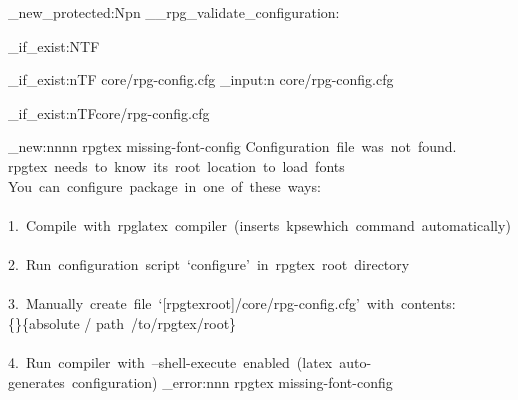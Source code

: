 
\ExplSyntaxOn
\cs_new_protected:Npn \__rpg_validate_configuration:
{

\cs_if_exist:NTF\RpgPackagePath
{
}
{
\file_if_exist:nTF { core/rpg-config.cfg }
{
\file_input:n { core/rpg-config.cfg }
}
{
\immediate{}
\file_if_exist:nTF{core/rpg-config.cfg}
{

}
{
\msg_new:nnnn { rpgtex } { missing-font-config }
{
Configuration~file~was~not~found.
\\
rpgtex~needs~to~know~its~root~location~to~load~fonts
\\
You~can~configure~package~in~one~of~these~ways:
\\\\
1.~Compile~with~rpglatex~compiler~(inserts~kpsewhich~command~automatically)
\\\\
2.~Run~configuration~script~`configure'~in~rpgtex~root~directory
\\\\
3.~Manually~create~file~`[rpgtexroot]/core/rpg-config.cfg'~with~contents:\\
\unexpanded{\edef}\{\unexpanded{\RpgPackagePath}\}\{absolute / path~/to/rpgtex/root\}
\\\\
4.~Run~compiler~with~--shell-execute~enabled~(latex~auto-generates~configuration)
}{}
\msg_error:nnn { rpgtex } { missing-font-config } {  }
}
}
}
}
